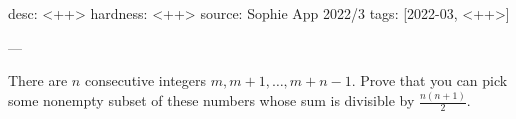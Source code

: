 desc: <++>
hardness: <++>
source: Sophie App 2022/3
tags: [2022-03, <++>]

---

There are $n$ consecutive integers $m, m+1, \dots, m+n-1$. Prove that you can pick some nonempty subset of these numbers whose sum is divisible by $\frac{n(n+1)}{2}$.
